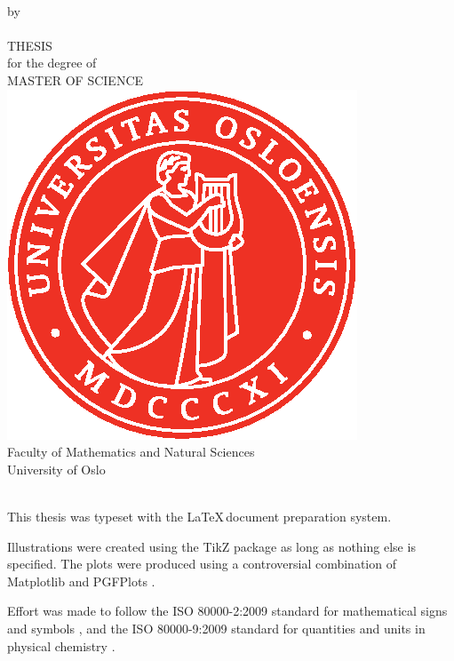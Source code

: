\thispagestyle{empty}
\begin{center} \vspace{1cm}
    \textbf{\Large{\mtitle}}\\ \vspace{0.5cm}
    \small{by}\\ \vspace{0.5cm}
    \large{\mauthor}\\ \vspace{4.4cm}
    \large{THESIS}\\ \vspace{0.3cm}
    \small{for the degree of}\\ \vspace{0.3cm}
    \large{MASTER OF SCIENCE}\\ \vspace{0.7cm}
    \includegraphics[scale=1.0]{Images/UiO_Segl_pms485.eps} \\ \vspace{0.5cm}
    \large{Faculty of Mathematics and Natural Sciences \\ University of Oslo} \\ \vspace{0.5cm}
    \small{\mdate}\\ \vfill
\end{center}
\newpage
\vspace*{\fill}
{\setlength{\parindent}{0cm}
This thesis was typeset with the \LaTeX\,document preparation system.\bigskip

Illustrations were created using the TikZ package \cite{tantau_graph_2013} as long as nothing else is specified. The plots were produced using a controversial combination of Matplotlib \cite{hunter_matplotlib:_2007} and PGFPlots \cite{tantau_graph_2013}.\bigskip

Effort was made to follow the ISO 80000-2:2009 standard for mathematical signs and symbols \cite{iso/tc_12_iso_nodate}, and the ISO 80000-9:2009 standard for quantities and units in physical chemistry \cite{iso/tc_12_iso_nodate-1}.
} 
\newpage

